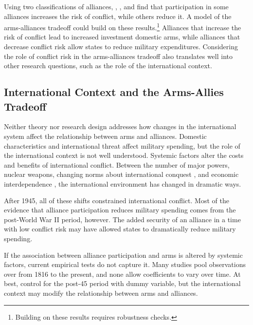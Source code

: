 \documentclass[12pt]{article}
\begin{document}
Using two classifications of alliances, \citet{Benson2011}, \citet{Leeds2003}, and \citet{JohnsonLeeds2011} find that participation in some alliances increases the risk of conflict, while others reduce it. 
A model of the arms-alliances tradeoff could build on these results.\footnote{Building on these results requires robustness checks.} 
Alliances that increase the risk of conflict lead to increased investment domestic arms, while alliances that decrease conflict risk allow states to reduce military expenditures. 
Considering the role of conflict risk in the arms-alliances tradeoff also translates well into other research questions, such as the role of the international context. 



\subsection{International Context and the Arms-Allies Tradeoff}


Neither theory nor research design addresses how changes in the international system affect the relationship between arms and alliances. 
Domestic characteristics and international threat affect military spending, but the role of the international context is not well understood.
Systemic factors alter the costs and benefits of international conflict.
Between the number of major powers, nuclear weapons, changing norms about international conquest \citep{Fazal2011}, and economic interdependence \citep{Frieden2006}, the international environment has changed in dramatic ways.


After 1945, all of these shifts constrained international conflict. 
Most of the evidence that alliance participation reduces military spending comes from the post-World War II period, however.  
The added security of an alliance in a time with low conflict risk may have allowed states to dramatically reduce military spending. 


If the association between alliance participation and arms is altered by systemic factors, current empirical tests do not capture it. 
Many studies pool observations over from 1816 to the present, and none allow coefficients to vary over time. 
At best, \citet{Horowitzetal2017} control for the post-45 period with dummy variable, but the international context may modify the relationship between arms and alliances. 
\end{document}
